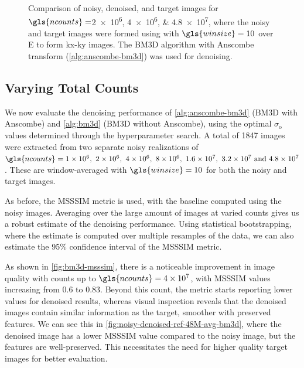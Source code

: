 \begin{figure}
    \caption{Comparison of noisy, denoised, and target images for $\gls{ncounts}=$\numlist{2e6;4e6;4.8e7}, where the noisy and target images were formed using with $\gls{winsize}=\num{10}$ over \gls{E} to form \gls{kx}-\gls{ky} images. The \gls{BM3D} algorithm with Anscombe transform (\cref{alg:anscombe-bm3d}) was used for denoising.}
    \label{fig:combined-noisy-denoised}
\end{figure}

\subsection{Varying Total Counts}
We now evaluate the denoising performance of \cref{alg:anscombe-bm3d} (\gls{BM3D} with Anscombe) and \cref{alg:bm3d} (\gls{BM3D} without Anscombe), using the optimal $\sigma_{\text{o}}$ values determined through the hyperparameter search. A total of \num{1847} images were extracted from two separate noisy realizations of $\gls{ncounts}=\numlist{1e6;2e6;4e6;8e6;1.6e7;3.2e7;4.8e7}$. These are window-averaged with $\gls{winsize}=10$ for both the noisy and target images. 

As before, the \gls{MSSSIM} metric is used, with the baseline computed using the noisy images. Averaging over the large amount of images at varied counts gives us a robust estimate of the denoising performance. Using statistical bootstrapping, where the estimate is computed over multiple resamples of the data, we can also estimate the \num{95}\% confidence interval of the \gls{MSSSIM} metric.

As shown in \cref{fig:bm3d-msssim}, there is a noticeable improvement in image quality with counts up to $\gls{ncounts}=\num{4e7}$, with \gls{MSSSIM} values increasing from \num{0.6} to \num{0.83}. Beyond this count, the metric starts reporting lower values for denoised results, whereas visual inspection reveals that the denoised images contain similar information as the target, smoother with preserved features. We can see this in \cref{fig:noisy-denoised-ref-48M-avg-bm3d}, where the denoised image has a lower \gls{MSSSIM} value compared to the noisy image, but the features are well-preserved. This necessitates the need for higher quality target images for better evaluation.

